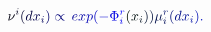 \documentclass[12pt]{article}
\begin{document}
\makeatletter
\renewcommand*{\@textcolor}[3]{%
  \protect\leavevmode
  \begingroup
    \color#1{#2}#3%
  \endgroup
}
\makeatother
\begin{displaymath}
\mathcolor[RGB]{0,0,15}{\nu} ^ { \mathcolor[RGB]{0,0,30}{i} } \mathcolor[RGB]{0,0,45}{(} \mathcolor[RGB]{0,0,60}{d} \mathcolor[RGB]{0,0,75}{x} _ { \mathcolor[RGB]{0,0,90}{i} } \mathcolor[RGB]{0,0,105}{)} \mathcolor[RGB]{0,0,120}{\propto} \mathcolor[RGB]{0,0,135}{\operatorname*} { \mathcolor[RGB]{0,0,150}{e} \mathcolor[RGB]{0,0,165}{x} \mathcolor[RGB]{0,0,180}{p} } \mathcolor[RGB]{0,0,195}{(} \mathcolor[RGB]{0,0,210}{-} \mathcolor[RGB]{0,0,225}{\Phi} _ { \mathcolor[RGB]{0,0,240}{i} } ^ { \mathcolor[RGB]{0,0,255}{r} } \mathcolor[RGB]{0,15,0}{(} \mathcolor[RGB]{0,15,15}{x} _ { \mathcolor[RGB]{0,15,30}{i} } \mathcolor[RGB]{0,15,45}{)} \mathcolor[RGB]{0,15,60}{)} \mathcolor[RGB]{0,15,75}{\mu} _ { \mathcolor[RGB]{0,15,90}{i} } ^ { \mathcolor[RGB]{0,15,105}{r} } \mathcolor[RGB]{0,15,120}{(} \mathcolor[RGB]{0,15,135}{d} \mathcolor[RGB]{0,15,150}{x} _ { \mathcolor[RGB]{0,15,165}{i} } \mathcolor[RGB]{0,15,180}{)} \mathcolor[RGB]{0,15,195}{.}
\end{displaymath}
\end{document}
